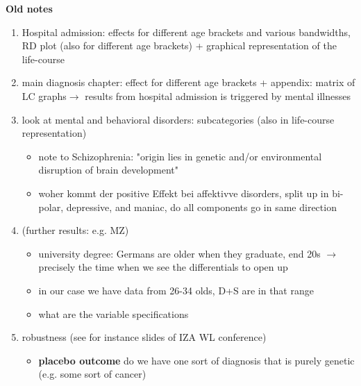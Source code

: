 \documentclass[11pt, a4paper]{article} %
\begin{document}
\newpage
\textbf{Old notes}
\begin{enumerate}
	\item Hospital admission: effects for different age brackets and various bandwidths, RD plot (also for different age brackets) + graphical representation of the life-course
	\item main diagnosis chapter: effect for different age brackets + appendix: matrix of LC graphs\newline $\rightarrow$ results from hospital admission is triggered by mental illnesses
	\item look at mental and behavioral disorders: subcategories (also in life-course representation) 
	\begin{itemize}
		\item 	note to Schizophrenia: "origin lies in genetic and/or environmental disruption of brain development" \citep{owen2016schizophrenia}
		\item woher kommt der positive Effekt bei affektivve disorders, split up in bi-polar, depressive, and maniac, do all components go in same direction
	\end{itemize}
	\item (further results: e.g. MZ)
	\begin{itemize}
		\item university degree: Germans are older when they graduate, end 20s $\rightarrow$ precisely the time when we see the differentials to open up
		\item in our case we have data from 26-34 olds, D+S are in that range
		\item what are the variable specifications
	\end{itemize}
	\item robustness (see for instance slides of IZA WL conference)
	\begin{itemize}
		\item \textbf{placebo outcome} do we have one sort of diagnosis that is purely genetic (e.g. some sort of cancer)
	\end{itemize}
\end{enumerate}












\end{document}
